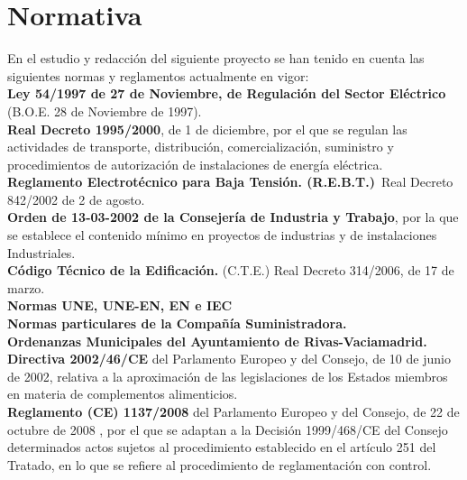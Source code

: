 \section{Normativa}

En el estudio y redacción del siguiente proyecto se han tenido en cuenta las siguientes normas y reglamentos actualmente en vigor:\\

{\bfseries Ley 54/1997 de 27 de Noviembre, de Regulación del Sector Eléctrico} (B.O.E. 28 de Noviembre de 1997).\\

{\bfseries Real Decreto 1995/2000}, de 1 de diciembre, por el que se regulan las actividades de transporte, distribución, comercialización, suministro y procedimientos de autorización de instalaciones de energía eléctrica.\\

{\bfseries Reglamento Electrotécnico para Baja Tensión. (R.E.B.T.)}\
Real Decreto 842/2002 de 2 de agosto.\\

{\bfseries Orden de 13-03-2002 de la Consejería de Industria y Trabajo}, por la que se establece el contenido mínimo en proyectos de industrias y de instalaciones Industriales.\\

{\bfseries Código Técnico de la Edificación.} (C.T.E.) Real Decreto 314/2006, de 17 de marzo.\\

{\bfseries Normas UNE, UNE-EN, EN e IEC}\\

{\bfseries Normas particulares de la Compañía Suministradora.}\\

{\bfseries Ordenanzas Municipales del Ayuntamiento de Rivas-Vaciamadrid.}\\

{\bfseries Directiva 2002/46/CE} del Parlamento Europeo y del Consejo, de 10 de junio de 2002, relativa a la aproximación de las legislaciones de los Estados miembros en materia de complementos alimenticios.\\

{\bfseries Reglamento (CE) 1137/2008} del Parlamento Europeo y del Consejo, de 22 de octubre de 2008 , por el que se adaptan a la Decisión 1999/468/CE del Consejo determinados actos sujetos al procedimiento establecido en el artículo 251 del Tratado, en lo que se refiere al procedimiento de reglamentación con control.\\

